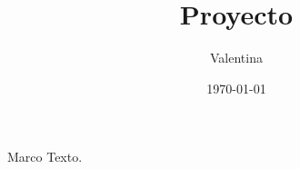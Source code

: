\documentclass{beamer}
\title{Proyecto}
\author{Valentina}
\institute{San Bartolomé}
\date{\today}
\begin{document}
\begin{frame}{Marco}
Texto.
\end{frame}
\end{document}

